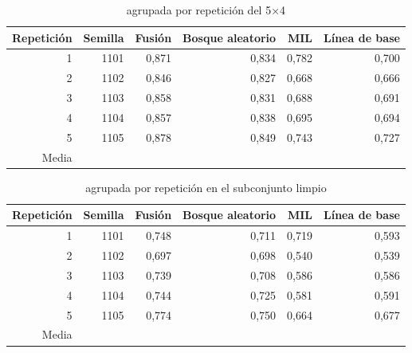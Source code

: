 \begin{table}[H]
\caption{\fmacro{} agrupada por repetición del 5$\times$4}\label{tab:a-rep}
{\singlespacing\small
\begin{tabular}{@{}rrrrrr@{}}
\toprule
Repetición & Semilla & Fusión & Bosque aleatorio & MIL & Línea de base \\
\midrule
1 & 1101 & 0,871 & 0,834 & 0,782 & 0,700 \\
2 & 1102 & 0,846 & 0,827 & 0,668 & 0,666 \\
3 & 1103 & 0,858 & 0,831 & 0,688 & 0,691 \\
4 & 1104 & 0,857 & 0,838 & 0,695 & 0,694 \\
5 & 1105 & 0,878 & 0,849 & 0,743 & 0,727 \\
\midrule
Media & & \FusionAgrupF{} & \RFPoseAgrupF{} & \MILAgrupF{} & \BaseAgrupF{} \\
\bottomrule
\end{tabular}}
\end{table}

\begin{table}[H]
\caption{\fmacro{} agrupada por repetición en el subconjunto limpio}\label{tab:a-replim}
{\singlespacing\small
\begin{tabular}{@{}rrrrrr@{}}
\toprule
Repetición & Semilla & Fusión & Bosque aleatorio & MIL & Línea de base \\
\midrule
1 & 1101 & 0,748 & 0,711 & 0,719 & 0,593 \\
2 & 1102 & 0,697 & 0,698 & 0,540 & 0,539 \\
3 & 1103 & 0,739 & 0,708 & 0,586 & 0,586 \\
4 & 1104 & 0,744 & 0,725 & 0,581 & 0,591 \\
5 & 1105 & 0,774 & 0,750 & 0,664 & 0,677 \\
\midrule
Media & & \FusionAgrupLimpioF{} & \RFPoseAgrupLimpioF{} & \MILAgrupLimpioF{} & \BaseAgrupLimpioF{} \\
\bottomrule
\end{tabular}}
\end{table}

